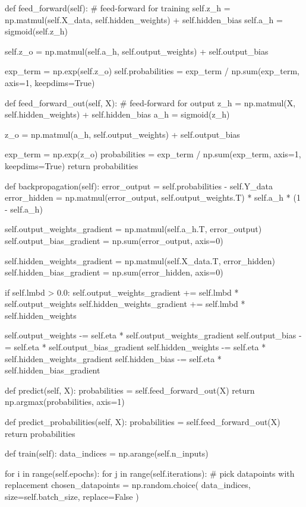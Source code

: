 \documentclass[%
oneside,                 %
final,                   %
10pt]{article}
\begin{document}
    def feed_forward(self):
        # feed-forward for training
        self.z_h = np.matmul(self.X_data, self.hidden_weights) + self.hidden_bias
        self.a_h = sigmoid(self.z_h)

        self.z_o = np.matmul(self.a_h, self.output_weights) + self.output_bias

        exp_term = np.exp(self.z_o)
        self.probabilities = exp_term / np.sum(exp_term, axis=1, keepdims=True)

    def feed_forward_out(self, X):
        # feed-forward for output
        z_h = np.matmul(X, self.hidden_weights) + self.hidden_bias
        a_h = sigmoid(z_h)

        z_o = np.matmul(a_h, self.output_weights) + self.output_bias
        
        exp_term = np.exp(z_o)
        probabilities = exp_term / np.sum(exp_term, axis=1, keepdims=True)
        return probabilities

    def backpropagation(self):
        error_output = self.probabilities - self.Y_data
        error_hidden = np.matmul(error_output, self.output_weights.T) * self.a_h * (1 - self.a_h)

        self.output_weights_gradient = np.matmul(self.a_h.T, error_output)
        self.output_bias_gradient = np.sum(error_output, axis=0)

        self.hidden_weights_gradient = np.matmul(self.X_data.T, error_hidden)
        self.hidden_bias_gradient = np.sum(error_hidden, axis=0)

        if self.lmbd > 0.0:
            self.output_weights_gradient += self.lmbd * self.output_weights
            self.hidden_weights_gradient += self.lmbd * self.hidden_weights

        self.output_weights -= self.eta * self.output_weights_gradient
        self.output_bias -= self.eta * self.output_bias_gradient
        self.hidden_weights -= self.eta * self.hidden_weights_gradient
        self.hidden_bias -= self.eta * self.hidden_bias_gradient

    def predict(self, X):
        probabilities = self.feed_forward_out(X)
        return np.argmax(probabilities, axis=1)

    def predict_probabilities(self, X):
        probabilities = self.feed_forward_out(X)
        return probabilities

    def train(self):
        data_indices = np.arange(self.n_inputs)

        for i in range(self.epochs):
            for j in range(self.iterations):
                # pick datapoints with replacement
                chosen_datapoints = np.random.choice(
                    data_indices, size=self.batch_size, replace=False
                )
\end{document}
